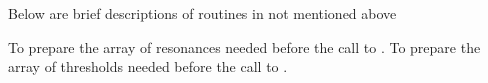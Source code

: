 \bigskip

Below are brief descriptions of routines in  not mentioned above

\begin{brief-subs}
  To prepare the array of resonances needed before the
  call to .
  To prepare the array of thresholds needed before the
  call to .
\end{brief-subs}

